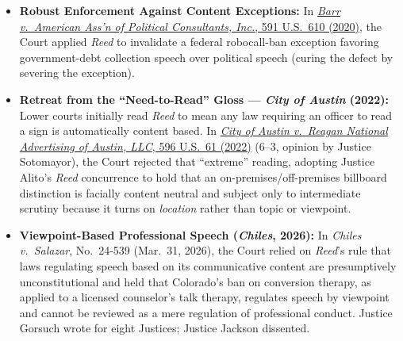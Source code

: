 \documentclass[12pt]{article}
\begin{document}
\begin{itemize}
  \item \textbf{Robust Enforcement Against Content Exceptions:} In \href{https://supreme.justia.com/cases/federal/us/591/19-631/}{\textit{Barr v.\ American Ass'n of Political Consultants, Inc.}, 591 U.S.\ 610 (2020)}, the Court applied \textit{Reed} to invalidate a federal robocall-ban exception favoring government-debt collection speech over political speech (curing the defect by severing the exception).
  \item \textbf{Retreat from the ``Need-to-Read'' Gloss --- \textit{City of Austin} (2022):} Lower courts initially read \textit{Reed} to mean any law requiring an officer to read a sign is automatically content based. In \href{https://supreme.justia.com/cases/federal/us/596/20-1029/}{\textit{City of Austin v.\ Reagan National Advertising of Austin, LLC}, 596 U.S.\ 61 (2022)} (6--3, opinion by Justice Sotomayor), the Court rejected that ``extreme'' reading, adopting Justice Alito's \textit{Reed} concurrence to hold that an on-premises/off-premises billboard distinction is facially content neutral and subject only to intermediate scrutiny because it turns on \textit{location} rather than topic or viewpoint.

\item \textbf{Viewpoint-Based Professional Speech (\textit{Chiles}, 2026):} In \textit{Chiles v.\ Salazar}, No.~24-539 (Mar.~31, 2026), the Court relied on \textit{Reed}'s rule that laws regulating speech based on its communicative content are presumptively unconstitutional and held that Colorado's ban on conversion therapy, as applied to a licensed counselor's talk therapy, regulates speech by viewpoint and cannot be reviewed as a mere regulation of professional conduct. Justice Gorsuch wrote for eight Justices; Justice Jackson dissented.
\end{itemize}
\end{document}
